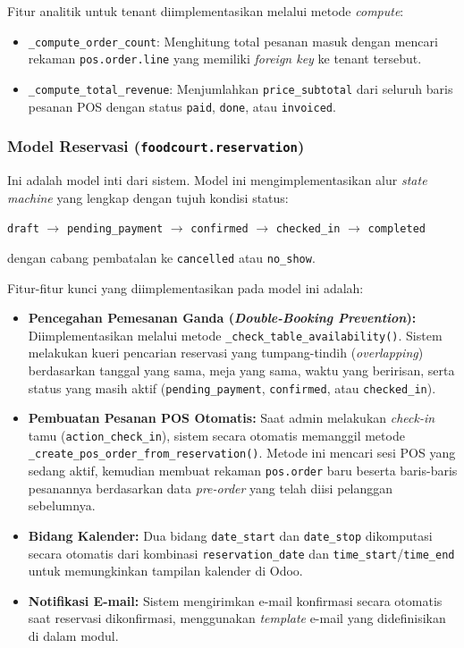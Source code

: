 \documentclass[conference]{IEEEtran}
\begin{document}
Fitur analitik untuk tenant diimplementasikan melalui metode \textit{compute}:
\begin{itemize}
    \item \texttt{\_compute\_order\_count}: Menghitung total pesanan masuk dengan mencari rekaman \texttt{pos.order.line} yang memiliki \textit{foreign key} ke tenant tersebut.
    \item \texttt{\_compute\_total\_revenue}: Menjumlahkan \texttt{price\_subtotal} dari seluruh baris pesanan POS dengan status \texttt{paid}, \texttt{done}, atau \texttt{invoiced}.
\end{itemize}

\subsubsection{Model Reservasi (\texttt{foodcourt.reservation})}
Ini adalah model inti dari sistem. Model ini mengimplementasikan alur \textit{state machine} yang lengkap dengan tujuh kondisi status:

\begin{center}
\texttt{draft} $\rightarrow$ \texttt{pending\_payment} $\rightarrow$ \texttt{confirmed} $\rightarrow$ \texttt{checked\_in} $\rightarrow$ \texttt{completed}
\end{center}

dengan cabang pembatalan ke \texttt{cancelled} atau \texttt{no\_show}.

Fitur-fitur kunci yang diimplementasikan pada model ini adalah:
\begin{itemize}
    \item \textbf{Pencegahan Pemesanan Ganda (\textit{Double-Booking Prevention}):} Diimplementasikan melalui metode \texttt{\_check\_table\_availability()}. Sistem melakukan kueri pencarian reservasi yang tumpang-tindih (\textit{overlapping}) berdasarkan tanggal yang sama, meja yang sama, waktu yang beririsan, serta status yang masih aktif (\texttt{pending\_payment}, \texttt{confirmed}, atau \texttt{checked\_in}).
    \item \textbf{Pembuatan Pesanan POS Otomatis:} Saat admin melakukan \textit{check-in} tamu (\texttt{action\_check\_in}), sistem secara otomatis memanggil metode \texttt{\_create\_pos\_order\_from\_reservation()}. Metode ini mencari sesi POS yang sedang aktif, kemudian membuat rekaman \texttt{pos.order} baru beserta baris-baris pesanannya berdasarkan data \textit{pre-order} yang telah diisi pelanggan sebelumnya.
    \item \textbf{Bidang Kalender:} Dua bidang \texttt{date\_start} dan \texttt{date\_stop} dikomputasi secara otomatis dari kombinasi \texttt{reservation\_date} dan \texttt{time\_start}/\texttt{time\_end} untuk memungkinkan tampilan kalender di Odoo.
    \item \textbf{Notifikasi E-mail:} Sistem mengirimkan e-mail konfirmasi secara otomatis saat reservasi dikonfirmasi, menggunakan \textit{template} e-mail yang didefinisikan di dalam modul.
\end{itemize}
\end{document}
